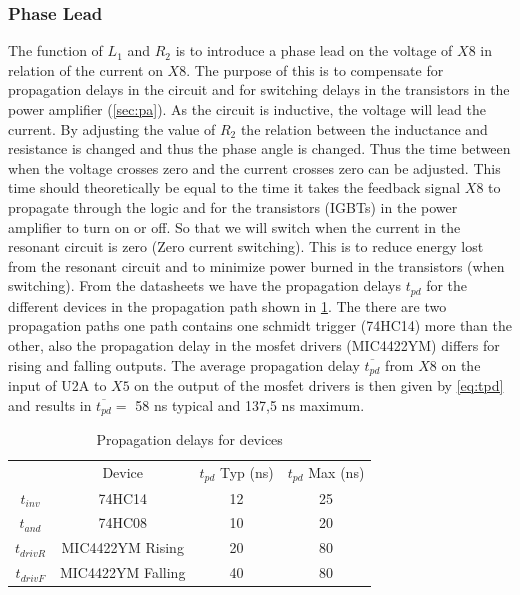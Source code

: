 \subsubsection{Phase Lead}
\label{sec:phaselead}
The function of $L_1$ and $R_2$ is to introduce a phase lead on the voltage of $X8$ in relation of the current on $X8$. The purpose of this is to compensate for propagation delays in the circuit and for switching delays in the transistors in the power amplifier (\cref{sec:pa}). As the circuit is inductive, the voltage will lead the current. By adjusting the value of $R_2$ the relation between the inductance and resistance is changed and thus the phase angle is changed. Thus the time between when the voltage crosses zero and the current crosses zero can be adjusted. This time should theoretically be equal to the time it takes the feedback signal $X8$ to propagate through the logic and for the transistors (IGBTs) in the power amplifier to turn on or off. So that we will switch when the current in the resonant circuit is zero (Zero current switching). This is to reduce energy lost from the resonant circuit and to minimize power burned in the transistors (when switching). From the datasheets we have the propagation delays $t_{pd}$ for the different devices in the propagation path shown in \cref{tab:tpd}. The there are two propagation paths one path contains one schmidt trigger (74HC14) more than the other, also the propagation delay in the mosfet drivers (MIC4422YM) differs for rising and falling outputs. The average propagation delay $\overline{t_{pd}}$ from $X8$ on the input of U2A to $X5$ on the output of the mosfet drivers is then given by \cref{eq:tpd} and results in $\overline{t_{pd}} =$ 58 ns typical and 137,5 ns maximum.

\begin{table}[H]
    \centering
    \begin{tabular}{c|c|c|c}
                &   Device              & $t_{pd}$ Typ (ns)   & $t_{pd}$ Max (ns) \\
        $t_{inv}$ &   74HC14              & 12            & 25\\
        $t_{and}$ &   74HC08              & 10            & 20\\
        $t_{driv R}$& MIC4422YM Rising    & 20            & 80\\
        $t_{driv F}$& MIC4422YM Falling   & 40            & 80
    \end{tabular}
    \caption{Propagation delays for devices}
    \label{tab:tpd}
\end{table}

